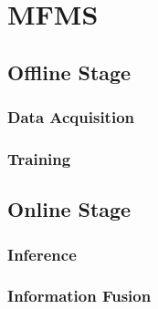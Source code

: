 \section{\label{sec-MFMS}MFMS}

    \subsection{Offline Stage}

    \subsubsection{Data Acquisition}

    \subsubsection{Training}

  \subsection{Online Stage}

    \subsubsection{Inference}

    \subsubsection{Information Fusion}
